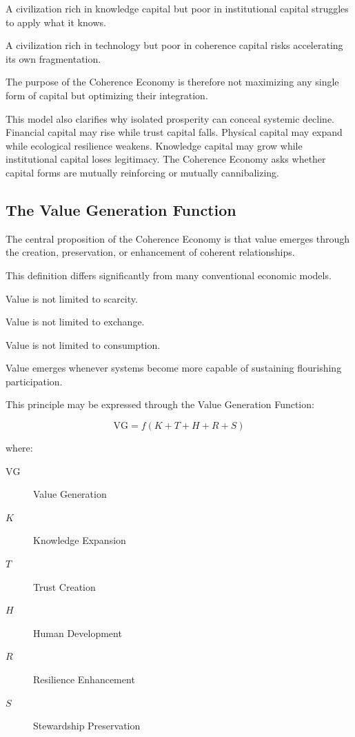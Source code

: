 \documentclass[12pt]{article}
\begin{document}
A civilization rich in knowledge capital but poor in institutional capital struggles to apply what it knows.

A civilization rich in technology but poor in coherence capital risks accelerating its own fragmentation.

The purpose of the Coherence Economy is therefore not maximizing any single form of capital but optimizing their integration.

This model also clarifies why isolated prosperity can conceal systemic decline. Financial capital may rise while trust capital falls. Physical capital may expand while ecological resilience weakens. Knowledge capital may grow while institutional capital loses legitimacy. The Coherence Economy asks whether capital forms are mutually reinforcing or mutually cannibalizing.

\subsection{The Value Generation Function}

The central proposition of the Coherence Economy is that value emerges through the creation, preservation, or enhancement of coherent relationships.

This definition differs significantly from many conventional economic models.

Value is not limited to scarcity.

Value is not limited to exchange.

Value is not limited to consumption.

Value emerges whenever systems become more capable of sustaining flourishing participation.

This principle may be expressed through the Value Generation Function:

\[
\mathrm{VG}=f(K+T+H+R+S)
\]

where:

\begin{description}
  \item[\(\mathrm{VG}\)] Value Generation
  \item[\(K\)] Knowledge Expansion
  \item[\(T\)] Trust Creation
  \item[\(H\)] Human Development
  \item[\(R\)] Resilience Enhancement
  \item[\(S\)] Stewardship Preservation
\end{description}
\end{document}
